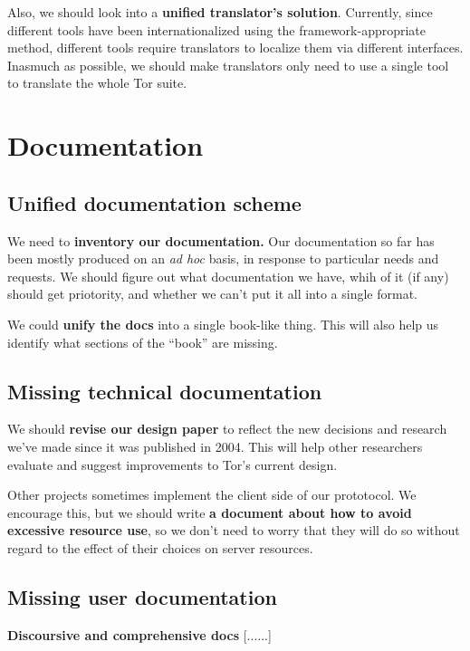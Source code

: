 \documentclass{article}
\newcommand{\tmp}[1]{{\bf #1} [......] \\}
\begin{document}
Also, we should look into a {\bf unified translator's solution}.  Currently,
since different tools have been internationalized using the
framework-appropriate method, different tools require translators to localize
them via different interfaces.  Inasmuch as possible, we should make
translators only need to use a single tool to translate the whole Tor suite.

\section{Documentation}

\subsection{Unified documentation scheme}

We need to {\bf inventory our documentation.}  Our documentation so far has
been mostly produced on an {\it ad hoc} basis, in response to particular
needs and requests.  We should figure out what documentation we have, whih of
it (if any) should get priotority, and whether we can't put it all into a
single format.

We could {\bf unify the docs} into a single book-like thing.  This will also
help us identify what sections of the ``book'' are missing.

\subsection{Missing technical documentation}

We should {\bf revise our design paper} to reflect the new decisions and
research we've made since it was published in 2004.  This will help other
researchers evaluate and suggest improvements to Tor's current design.

Other projects sometimes implement the client side of our prototocol.  We
encourage this, but we should write {\bf a document about how to avoid
excessive resource use}, so we don't need to worry that they will do so
without regard to the effect of their choices on server resources.

\subsection{Missing user documentation}

\tmp{Discoursive and comprehensive docs}
\end{document}
